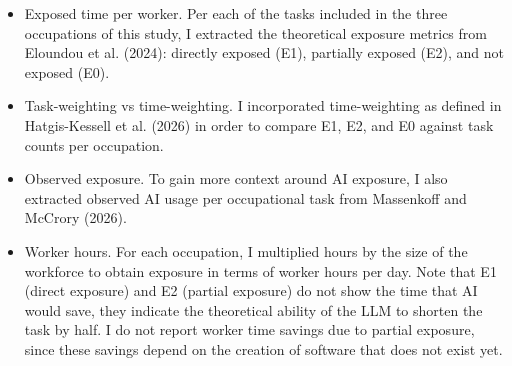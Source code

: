 \begin{itemize}
\item
  Exposed time per worker. Per each of the tasks included in the three occupations of this study, I extracted the theoretical exposure metrics from Eloundou et al. (2024): directly exposed (E1), partially exposed (E2), and not exposed (E0).
\item
  Task-weighting vs time-weighting. I incorporated time-weighting as defined in Hatgis-Kessell et al. (2026) in order to compare E1, E2, and E0 against task counts per occupation.
\item
  Observed exposure. To gain more context around AI exposure, I also extracted observed AI usage per occupational task from Massenkoff and McCrory (2026).
\item
  Worker hours. For each occupation, I multiplied hours by the size of the workforce to obtain exposure in terms of worker hours per day. Note that E1 (direct exposure) and E2 (partial exposure) do not show the time that AI would save, they indicate the theoretical ability of the LLM to shorten the task by half. I do not report worker time savings due to partial exposure, since these savings depend on the creation of software that does not exist yet.
\end{itemize}
